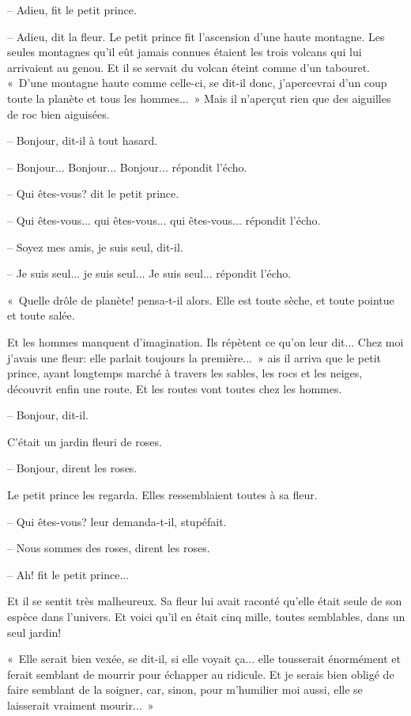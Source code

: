 \documentclass[a4paper]{report}
\begin{document}
-- Adieu, fit le petit prince.

-- Adieu, dit la fleur.
\parachapter{} %
Le petit prince fit l'ascension d'une haute montagne. Les seules montagnes qu'il eût jamais connues étaient les trois volcans qui lui arrivaient au genou. Et il se servait du volcan éteint comme d'un tabouret. «~D'une montagne haute comme celle-ci, se dit-il donc, j'apercevrai d'un coup toute la planète et tous les hommes...~» Mais il n'aperçut rien que des aiguilles de roc bien aiguisées.


-- Bonjour, dit-il à tout hasard.

-- Bonjour... Bonjour... Bonjour... répondit l'écho.

-- Qui êtes-vous? dit le petit prince.

-- Qui êtes-vous... qui êtes-vous... qui êtes-vous... répondit l'écho.

-- Soyez mes amis, je suis seul, dit-il.

-- Je suis seul... je suis seul... Je suis seul... répondit l'écho.

«~Quelle drôle de planète! pensa-t-il alors. Elle est toute sèche, et toute pointue et toute salée.

Et les hommes manquent d'imagination. Ils répètent ce qu'on leur dit... Chez moi j'avais une fleur: elle parlait toujours la première...~»
\parachapter{} %
ais il arriva que le petit prince, ayant longtemps marché à travers les sables, les rocs et les neiges, découvrit enfin une route. Et les routes vont toutes chez les hommes.

-- Bonjour, dit-il.

C'était un jardin fleuri de roses.

-- Bonjour, dirent les roses.

Le petit prince les regarda. Elles ressemblaient toutes à sa fleur.

-- Qui êtes-vous? leur demanda-t-il, stupéfait.

-- Nous sommes des roses, dirent les roses.

-- Ah! fit le petit prince...

Et il se sentit très malheureux. Sa fleur lui avait raconté qu'elle était seule de son espèce dans l'univers. Et voici qu'il en était cinq mille, toutes semblables, dans un seul jardin!


«~Elle serait bien vexée, se dit-il, si elle voyait ça... elle tousserait énormément et ferait semblant de mourrir pour échapper au ridicule. Et je serais bien obligé de faire semblant de la soigner, car, sinon, pour m'humilier moi aussi, elle se laisserait vraiment mourir...~»
\end{document}
